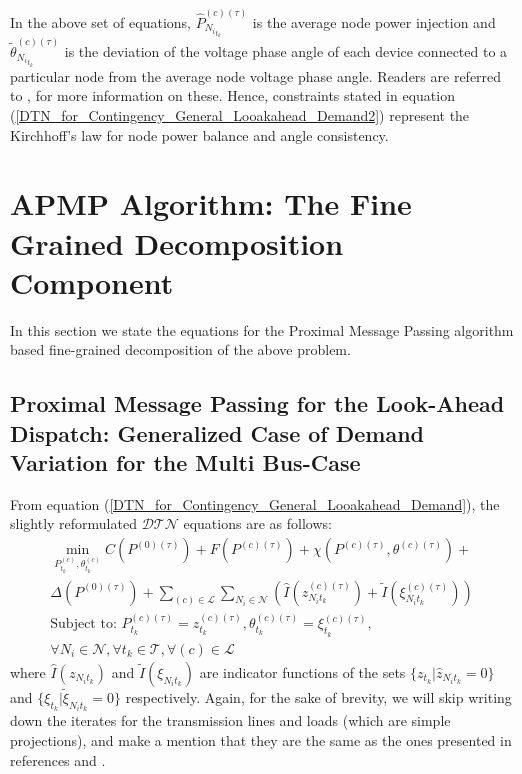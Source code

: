 \documentclass[preprint,12pt,3p]{elsarticle}
\begin{document}
In the above set of equations, $\hat{P}_{{N_i}_{t_k}}^{(c)(\tau)}$ is the average node power injection and $\tilde{\theta}_{{N_i}_{t_k}}^{(c)(\tau)}$ is the deviation of the voltage phase angle of each device connected to a particular node from the average node voltage phase angle. Readers are referred to \cite{CK:14}, \cite{KC:13} for more information on these. Hence, constraints stated in equation (\ref{DTN_for_Contingency_General_Looakahead_Demand2}) represent the Kirchhoff's law for node power balance and angle consistency.
\section{APMP Algorithm: The Fine Grained Decomposition Component}
\label{PMPAlgorithm}
In this section we state the equations for the Proximal Message Passing algorithm based fine-grained decomposition of the above problem.
\subsection{Proximal Message Passing for the Look-Ahead Dispatch: Generalized Case of Demand Variation for the Multi Bus-Case}
From equation (\ref{DTN_for_Contingency_General_Looakahead_Demand}), the slightly reformulated $\mathcal{DTN}$ equations are as follows:
\begin{equation}\label{DTN_Reform_Demand_Var_General}
\begin{array}{ll}
\min_{P_{t_k}^{(c)},\theta_{t_k}^{(c)}}C(P^{(0)(\tau)})
+F(P^{(c)(\tau)})+\chi(P^{(c)(\tau)},\theta^{(c)(\tau)})+\\\Delta(P^{(0)(\tau)})+\sum_{(c)\in\mathcal{L}}\sum_{{N_i}\in\mathcal{N}}(\hat{I}(z_{{N_i}{t_k}}^{(c)(\tau)})+\tilde{I}(\xi_{{N_i}{t_k}}^{(c)(\tau)}))\\
\text{Subject to: }P_{t_k}^{(c)(\tau)}=z_{t_k}^{(c)(\tau)}, {\theta}_{t_k}^{(c)(\tau)}=\xi_{t_k}^{(c)(\tau)},\\ \forall N_i\in\mathcal{N}, \forall t_k\in\mathcal{T},
\forall (c)\in\mathcal{L}
\end{array}
\end{equation}
where $\hat{I}(z_{{N_i}{t_k}})$ and $\tilde{I}(\xi_{{N_i}{t_k}})$ are indicator functions of the sets $\{z_{t_k}|\hat{z}_{{N_i}{t_k}}=0\}$ and $\{\xi_{t_k}|\tilde{\xi}_{{N_i}{t_k}}=0\}$ respectively. Again, for the sake of brevity, we will skip writing down the iterates for the transmission lines and loads (which are simple projections), and make a mention that they are the same as the ones presented in references \cite{CK:14} and \cite{Sambuddha2017}.
\end{document}
